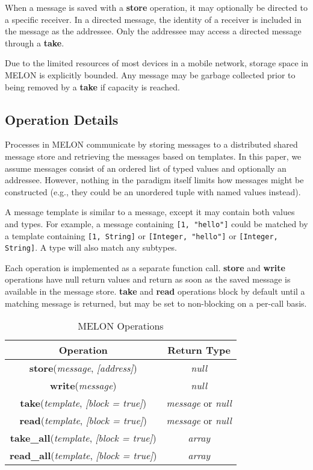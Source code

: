 When a message is saved with a \textbf{store} operation, it may optionally be directed to a specific receiver. In a directed message, the identity of a receiver is included in the message as the addressee. Only the addressee may access a directed message through a \textbf{take}.

Due to the limited resources of most devices in a mobile network, storage space in MELON is explicitly bounded. Any message may be garbage collected prior to being removed by a \textbf{take} if capacity is reached.

\subsection{Operation Details}

Processes in MELON communicate by storing messages to a distributed shared message store and retrieving the messages based on templates. In this paper, we assume messages consist of an ordered list of typed values and optionally an addressee. However, nothing in the paradigm itself limits how messages might be constructed (e.g., they could be an unordered tuple with named values instead).

A message template is similar to a message, except it may contain both values and types. For example, a message containing \texttt{[1, "hello"]} could be matched by a template containing \texttt{[1, String]} or \texttt{[Integer, "hello"]} or \texttt{[Integer, String]}. A type will also match any subtypes.

Each operation is implemented as a separate function call. \textbf{store} and \textbf{write} operations have null return values and return as soon as the saved message is available in the message store. \textbf{take} and \textbf{read} operations block by default until a matching message is returned, but may be set to non-blocking on a per-call basis.

\begin{table}
\centering
\begin{tabular}{|c|c|}
\hline
\textbf{Operation} & \textbf{Return Type} \\ \hline
\textbf{store}(\textit{message}, \textit{[address]}) & \textit{null} \\ \hline
\textbf{write}(\textit{message}) & \textit{null} \\ \hline
\textbf{take}(\textit{template}, \textit{[block = true]}) & \textit{message} or \textit{null} \\ \hline
\textbf{read}(\textit{template}, \textit{[block = true]}) & \textit{message} or \textit{null} \\ \hline
\textbf{take\_all}(\textit{template}, \textit{[block = true]}) & \textit{array} \\ \hline
\textbf{read\_all}(\textit{template}, \textit{[block = true]}) & \textit{array} \\ \hline
\end{tabular}
\caption{MELON Operations}
\end{table}

